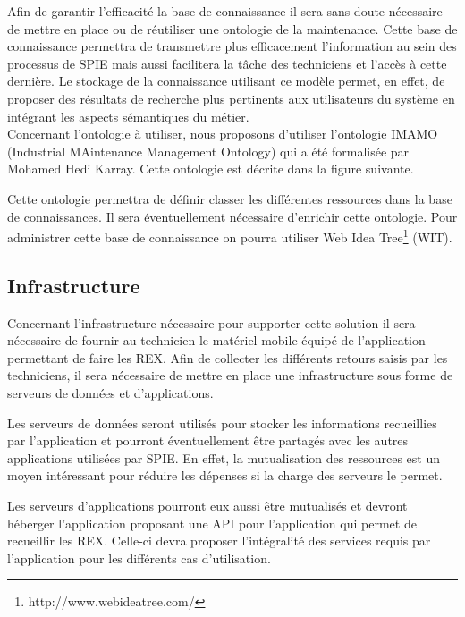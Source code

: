 Afin de garantir l’efficacité la base de connaissance il sera sans doute nécessaire de mettre en place ou de réutiliser une ontologie de la maintenance. Cette base de connaissance permettra de transmettre plus efficacement l’information au sein des processus de SPIE mais aussi facilitera la tâche des techniciens et l’accès à cette dernière. Le stockage de la connaissance utilisant ce modèle permet, en effet, de proposer des résultats de recherche plus pertinents aux utilisateurs du système en intégrant les aspects sémantiques du métier. \\

Concernant l’ontologie à utiliser,  nous proposons d’utiliser l’ontologie IMAMO (Industrial MAintenance Management Ontology) qui a été formalisée par Mohamed Hedi Karray. Cette ontologie est décrite dans la figure suivante. 


Cette ontologie permettra de définir classer les différentes ressources dans la base de connaissances. Il sera éventuellement nécessaire d’enrichir cette ontologie. Pour administrer cette base de connaissance on pourra utiliser Web Idea Tree\footnote{http://www.webideatree.com/} (WIT).

\subsection{Infrastructure}

Concernant l’infrastructure nécessaire pour supporter cette solution il sera nécessaire de fournir au technicien le matériel mobile équipé de l’application permettant de faire les REX. Afin de collecter les différents retours saisis par les techniciens, il sera nécessaire de mettre en place une infrastructure sous forme de serveurs de données  et d’applications. 

Les serveurs de données seront utilisés pour stocker les informations recueillies par l’application et pourront éventuellement être partagés avec les autres applications utilisées par SPIE. En effet, la mutualisation des ressources est un moyen intéressant pour réduire les dépenses si la charge des serveurs le permet.

Les serveurs d’applications pourront eux aussi être mutualisés et devront héberger l’application proposant une API pour l’application qui permet de recueillir les REX. Celle-ci devra proposer l’intégralité des services requis par l’application pour les différents cas d’utilisation.

